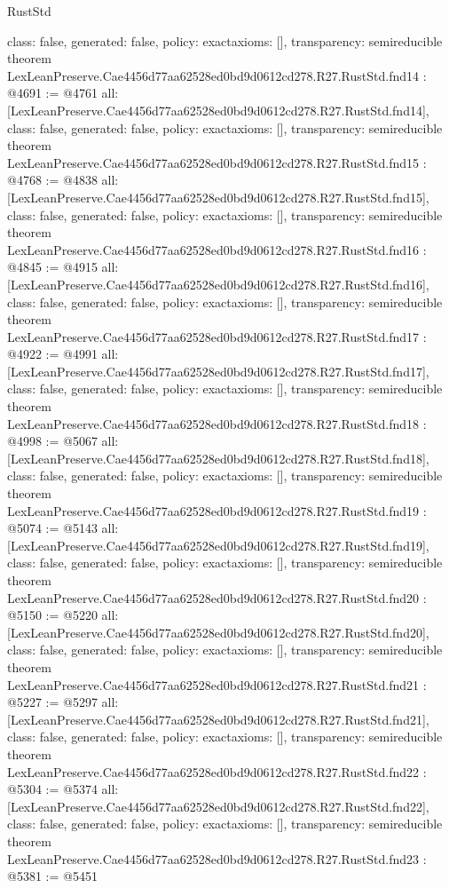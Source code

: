 \begin{lexlean}{RustStd}
\begin{coremodule}
{  class: false,
  generated: false,
  policy: exact{axioms: []},
  transparency: semireducible
}
theorem LexLeanPreserve.Cae4456d77aa62528ed0bd9d0612cd278.R27.RustStd.fnd14 : @4691 := @4761 {
  all: [LexLeanPreserve.Cae4456d77aa62528ed0bd9d0612cd278.R27.RustStd.fnd14],
  class: false,
  generated: false,
  policy: exact{axioms: []},
  transparency: semireducible
}
theorem LexLeanPreserve.Cae4456d77aa62528ed0bd9d0612cd278.R27.RustStd.fnd15 : @4768 := @4838 {
  all: [LexLeanPreserve.Cae4456d77aa62528ed0bd9d0612cd278.R27.RustStd.fnd15],
  class: false,
  generated: false,
  policy: exact{axioms: []},
  transparency: semireducible
}
theorem LexLeanPreserve.Cae4456d77aa62528ed0bd9d0612cd278.R27.RustStd.fnd16 : @4845 := @4915 {
  all: [LexLeanPreserve.Cae4456d77aa62528ed0bd9d0612cd278.R27.RustStd.fnd16],
  class: false,
  generated: false,
  policy: exact{axioms: []},
  transparency: semireducible
}
theorem LexLeanPreserve.Cae4456d77aa62528ed0bd9d0612cd278.R27.RustStd.fnd17 : @4922 := @4991 {
  all: [LexLeanPreserve.Cae4456d77aa62528ed0bd9d0612cd278.R27.RustStd.fnd17],
  class: false,
  generated: false,
  policy: exact{axioms: []},
  transparency: semireducible
}
theorem LexLeanPreserve.Cae4456d77aa62528ed0bd9d0612cd278.R27.RustStd.fnd18 : @4998 := @5067 {
  all: [LexLeanPreserve.Cae4456d77aa62528ed0bd9d0612cd278.R27.RustStd.fnd18],
  class: false,
  generated: false,
  policy: exact{axioms: []},
  transparency: semireducible
}
theorem LexLeanPreserve.Cae4456d77aa62528ed0bd9d0612cd278.R27.RustStd.fnd19 : @5074 := @5143 {
  all: [LexLeanPreserve.Cae4456d77aa62528ed0bd9d0612cd278.R27.RustStd.fnd19],
  class: false,
  generated: false,
  policy: exact{axioms: []},
  transparency: semireducible
}
theorem LexLeanPreserve.Cae4456d77aa62528ed0bd9d0612cd278.R27.RustStd.fnd20 : @5150 := @5220 {
  all: [LexLeanPreserve.Cae4456d77aa62528ed0bd9d0612cd278.R27.RustStd.fnd20],
  class: false,
  generated: false,
  policy: exact{axioms: []},
  transparency: semireducible
}
theorem LexLeanPreserve.Cae4456d77aa62528ed0bd9d0612cd278.R27.RustStd.fnd21 : @5227 := @5297 {
  all: [LexLeanPreserve.Cae4456d77aa62528ed0bd9d0612cd278.R27.RustStd.fnd21],
  class: false,
  generated: false,
  policy: exact{axioms: []},
  transparency: semireducible
}
theorem LexLeanPreserve.Cae4456d77aa62528ed0bd9d0612cd278.R27.RustStd.fnd22 : @5304 := @5374 {
  all: [LexLeanPreserve.Cae4456d77aa62528ed0bd9d0612cd278.R27.RustStd.fnd22],
  class: false,
  generated: false,
  policy: exact{axioms: []},
  transparency: semireducible
}
theorem LexLeanPreserve.Cae4456d77aa62528ed0bd9d0612cd278.R27.RustStd.fnd23 : @5381 := @5451 {
}
\end{coremodule}
\end{lexlean}
